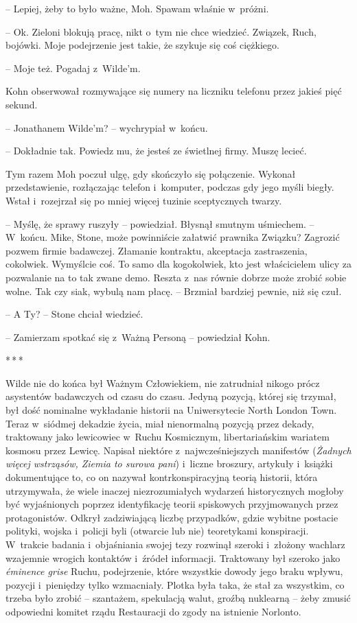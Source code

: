 \documentclass[oneside,polish,11pt,sfheadings]{mwbk}
\newcommand{\threeast}{\bigskip\par\centerline{*\,*\,*}\medskip\par}%
\begin{document}
-- Lepiej, żeby to było ważne, Moh. Spawam właśnie w~próżni.

-- Ok. Zieloni blokują pracę, nikt o~tym nie chce wiedzieć. Związek,
Ruch, bojówki. Moje podejrzenie jest takie, że szykuje się coś
ciężkiego.

-- Moje też. Pogadaj z~Wilde'm.

Kohn obserwował rozmywające się numery na liczniku telefonu przez jakieś
pięć sekund.

-- Jonathanem Wilde'm? -- wychrypiał w~końcu.

-- Dokładnie tak. Powiedz mu, że jesteś ze świetlnej firmy. Muszę lecieć.

Tym razem Moh poczuł ulgę, gdy skończyło się połączenie. Wykonał
przedstawienie, rozłączając telefon i~komputer, podczas gdy jego myśli
biegły. Wstał i~rozejrzał się po mniej więcej tuzinie sceptycznych
twarzy.

-- Myślę, że sprawy ruszyły -- powiedział. Błysnął smutnym uśmiechem. -- W~końcu. Mike, Stone, może powinniście załatwić prawnika Związku? Zagrozić
pozwem firmie badawczej. Złamanie kontraktu, akceptacja zastraszenia,
cokolwiek. Wymyślcie coś. To samo dla kogokolwiek, kto jest właścicielem
ulicy za pozwalanie na to tak zwane demo. Reszta z~nas równie dobrze
może zrobić sobie wolne. Tak czy siak, wybulą nam płacę. -- Brzmiał
bardziej pewnie, niż się czuł.

-- A Ty? -- Stone chciał wiedzieć.

-- Zamierzam spotkać się z~Ważną Personą -- powiedział Kohn.

  \threeast 

Wilde nie do końca był Ważnym Człowiekiem, nie zatrudniał nikogo prócz
asystentów badawczych od czasu do czasu. Jedyną pozycją, której się
trzymał, był dość nominalne wykładanie historii na Uniwersytecie North
London Town. Teraz w~siódmej dekadzie życia, miał nienormalną pozycją
przez dekady, traktowany jako lewicowiec w~Ruchu Kosmicznym,
libertariańskim wariatem kosmosu przez Lewicę. Napisał niektóre z~najwcześniejszych manifestów (\emph{Żadnych więcej wstrząsów, Ziemia to
surowa pani}) i~liczne broszury, artykuły i~książki dokumentujące to, co
on nazywał kontrkonspiracyjną teorią historii, która utrzymywała, że
wiele inaczej niezrozumiałych wydarzeń historycznych mogłoby być
wyjaśnionych poprzez identyfikację teorii spiskowych przyjmowanych przez
protagonistów. Odkrył zadziwiającą liczbę przypadków, gdzie wybitne
postacie polityki, wojska i~policji byli (otwarcie lub nie) teoretykami
konspiracji. W~trakcie badania i~objaśniania swojej tezy rozwinął
szeroki i~złożony wachlarz wzajemnie wrogich kontaktów i~źródeł
informacji. Traktowany był szeroko jako \emph{éminence grise} Ruchu,
podejrzenie, które wszystkie dowody jego braku wpływu, pozycji i~pieniędzy tylko wzmacniały. Plotka była taka, że stał za wszystkim, co
trzeba było zrobić -- szantażem, spekulacją walut, groźbą nuklearną -- żeby zmusić odpowiedni komitet rządu Restauracji do zgody na istnienie
Norlonto.
\end{document}

